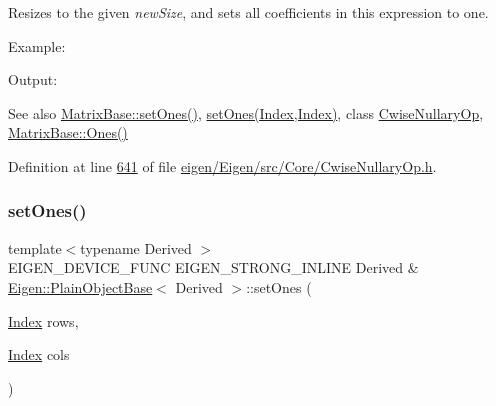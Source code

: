 Resizes to the given {\itshape new\+Size}, and sets all coefficients in this expression to one.

Example\+: 
\begin{DoxyCodeInclude}
\end{DoxyCodeInclude}
 Output\+: 
\begin{DoxyVerbInclude}
\end{DoxyVerbInclude}


\begin{DoxySeeAlso}{See also}
\hyperlink{group___core___module_ad18970fd7d9f9c3d8db9d05fa8652a25}{Matrix\+Base\+::set\+Ones()}, \hyperlink{class_eigen_1_1_plain_object_base_a8e3043e7a51c524c1d1793a3e9826819}{set\+Ones(\+Index,\+Index)}, class \hyperlink{group___core___module_class_eigen_1_1_cwise_nullary_op}{Cwise\+Nullary\+Op}, \hyperlink{group___core___module_a1284a38971d817c33e40c226f6347e37}{Matrix\+Base\+::\+Ones()} 
\end{DoxySeeAlso}


Definition at line \hyperlink{eigen_2_eigen_2src_2_core_2_cwise_nullary_op_8h_source_l00641}{641} of file \hyperlink{eigen_2_eigen_2src_2_core_2_cwise_nullary_op_8h_source}{eigen/\+Eigen/src/\+Core/\+Cwise\+Nullary\+Op.\+h}.

\mbox{\label{class_eigen_1_1_plain_object_base_a8e3043e7a51c524c1d1793a3e9826819}} 
\subsubsection{\texorpdfstring{set\+Ones()}{setOnes()}\hspace{0.1cm}{\footnotesize\ttfamily [2/2]}}
{\footnotesize\ttfamily template$<$typename Derived $>$ \\
E\+I\+G\+E\+N\+\_\+\+D\+E\+V\+I\+C\+E\+\_\+\+F\+U\+NC E\+I\+G\+E\+N\+\_\+\+S\+T\+R\+O\+N\+G\+\_\+\+I\+N\+L\+I\+NE Derived \& \hyperlink{class_eigen_1_1_plain_object_base}{Eigen\+::\+Plain\+Object\+Base}$<$ Derived $>$\+::set\+Ones (\begin{DoxyParamCaption}\item[{\hyperlink{namespace_eigen_a62e77e0933482dafde8fe197d9a2cfde}{Index}}]{rows,  }\item[{\hyperlink{namespace_eigen_a62e77e0933482dafde8fe197d9a2cfde}{Index}}]{cols }\end{DoxyParamCaption})}

